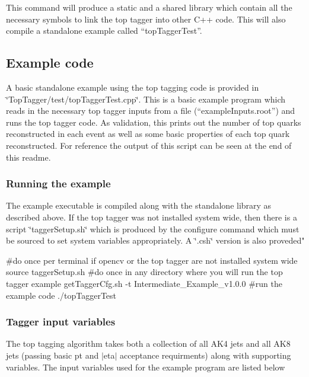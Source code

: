 This command will produce a static and a shared library which contain all the necessary symbols to link the top tagger into other C++ code. This will also compile a standalone example called ``top\-Tagger\-Test''.

\subsection*{Example code}

A basic standalone example using the top tagging code is provided in \char`\"{}\-Top\-Tagger/test/top\-Tagger\-Test.\-cpp\char`\"{}. This is a basic example program which reads in the necessary top tagger inputs from a file (``example\-Inputs.root'') and runs the top tagger code. As validation, this prints out the number of top quarks reconstructed in each event as well as some basic properties of each top quark reconstructed. For reference the output of this script can be seen at the end of this readme.

\subsubsection*{Running the example}

The example executable is compiled along with the standalone library as described above. If the top tagger was not installed system wide, then there is a script \char`\"{}tagger\-Setup.\-sh\char`\"{} which is produced by the configure command which must be sourced to set system variables appropriately. A \char`\"{}.\-csh\char`\"{} version is also proveded"


\begin{DoxyCode}
\textcolor{preprocessor}{#do once per terminal if opencv or the top tagger are not installed system wide}
\textcolor{preprocessor}{}source taggerSetup.sh
\textcolor{preprocessor}{#do once in any directory where you will run the top tagger example}
\textcolor{preprocessor}{}getTaggerCfg.sh -t Intermediate\_Example\_v1.0.0
\textcolor{preprocessor}{#run the example code}
\textcolor{preprocessor}{./topTaggerTest}
\end{DoxyCode}


\subsubsection*{Tagger input variables}

The top tagging algorithm takes both a collection of all A\-K4 jets and all A\-K8 jets (passing basic pt and $\vert$eta$\vert$ acceptance requirments) along with supporting variables. The input variables used for the example program are listed below


